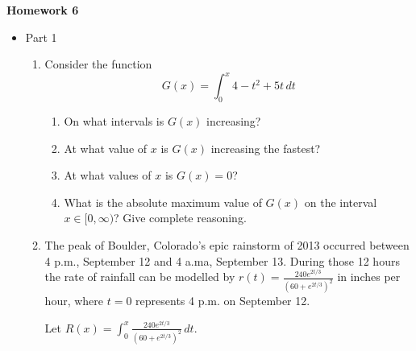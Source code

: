 \documentclass{article}
\begin{document}
\begin{center}
    \large \textbf{Homework 6}
\end{center}
        \begin{itemize}
            \item Part 1
                \begin{enumerate}
                    \item Consider the function
                    $$G(x) = \int_0^x 4-t^2+5t\,dt$$
                    \begin{enumerate}
                        \item On what intervals is $G(x)$ increasing?
                        \item At what value of $x$ is $G(x)$ increasing the fastest?
                        \item At what values of $x$ is $G(x)=0$?
                        \item What is the absolute maximum value of $G(x)$ on the interval $x \in [0,\infty)$? Give complete reasoning.
                    \end{enumerate}
                     \item The peak of Boulder, Colorado's epic rainstorm of 2013 occurred between 4 p.m., September 12 and 4 a.ma, September 13. During those 12 hours the rate of rainfall can be modelled by $\displaystyle r(t)=\frac{240e^{2t/3}}{\left( 60+e^{2t/3} \right)^2}$ in inches per hour, where $t=0$ represents 4 p.m. on September 12.

\begin{center}
\end{center}

Let $\displaystyle R(x)=\int_0^x \frac{240e^{2t/3}}{\left( 60+e^{2t/3} \right)^2} \,dt$.
\begin{enumerate}



\end{enumerate}
\end{enumerate}
\end{itemize}
\end{document}
